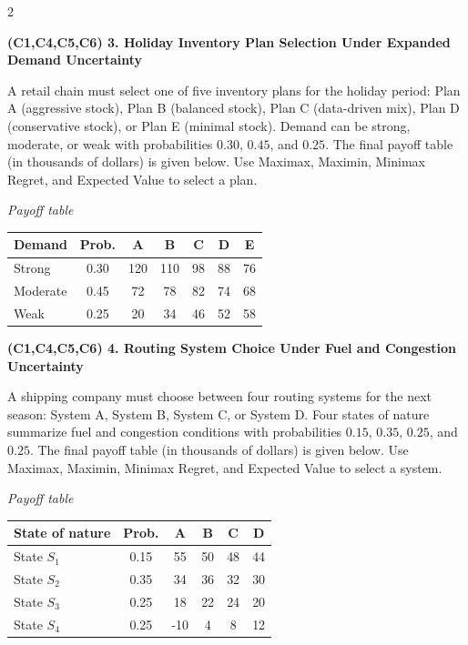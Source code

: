 \documentclass[12pt]{article}
\newcommand{\SubsectionBox}[1]{%
	\noindent\colorbox{gray!30}{%
		\parbox{\linewidth}{\textbf{#1}}%
	}\par\vspace{0.35cm}%
}
\begin{document}
\begin{multicols}{2}
		\vspace{0.25cm}
		\SubsectionBox{(C1,C4,C5,C6) 3. Holiday Inventory Plan Selection Under Expanded Demand Uncertainty}\vspace{-0.25cm}
		A retail chain must select one of five inventory plans for the holiday period: Plan A (aggressive stock),
		Plan B (balanced stock), Plan C (data-driven mix), Plan D (conservative stock), or Plan E (minimal stock).
		Demand can be strong, moderate, or weak with probabilities $0.30$, $0.45$, and $0.25$.
		The final payoff table (in thousands of dollars) is given below. Use Maximax, Maximin, Minimax Regret,
		and Expected Value to select a plan.
		
		\begin{center}
			\textit{Payoff table} \\
			\begin{tabular}{l c c c c c c}
				\hline
				Demand & Prob. & A & B & C & D & E \\
				\hline
				Strong & 0.30 & 120 & 110 & 98 & 88 & 76 \\
				Moderate & 0.45 & 72 & 78 & 82 & 74 & 68 \\
				Weak & 0.25 & 20 & 34 & 46 & 52 & 58 \\
				\hline
			\end{tabular}
		\end{center}
		
		\vspace{0.25cm}
		\SubsectionBox{(C1,C4,C5,C6) 4. Routing System Choice Under Fuel and Congestion Uncertainty}\vspace{-0.25cm}
		A shipping company must choose between four routing systems for the next season: System A, System B,
		System C, or System D. Four states of nature summarize fuel and congestion conditions
		with probabilities $0.15$, $0.35$, $0.25$, and $0.25$. The final payoff table (in thousands of dollars)
		is given below. Use Maximax, Maximin, Minimax Regret, and Expected Value to select a system.
		
		\begin{center}
			\textit{Payoff table} \\
			\begin{tabular}{l c c c c c}
				\hline
				State of nature & Prob. & A & B & C & D \\
				\hline
				State $S_1$ & 0.15 & 55 & 50 & 48 & 44 \\
				State $S_2$ & 0.35 & 34 & 36 & 32 & 30 \\
				State $S_3$ & 0.25 & 18 & 22 & 24 & 20 \\
				State $S_4$ & 0.25 & -10 & 4 & 8 & 12 \\
				\hline
			\end{tabular}
		\end{center}
		

\end{multicols}
\end{document}
